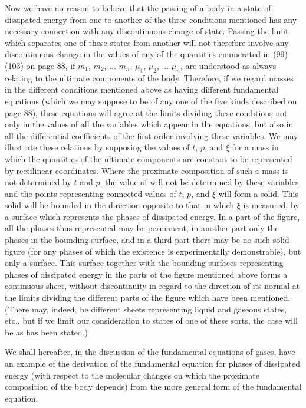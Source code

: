 \documentclass[12pt]{memoir}
\begin{document}
Now we have no reason to believe that the passing of a body in a state of dissipated energy from one to another of the three conditions mentioned has any necessary connection with any discontinuous change of state. Passing the limit which separates one of these states from another will not therefore involve any discontinuous change in the values of any of the quantities enumerated in (99)-(103) on page 88, if $m_1$, $m_2$, ... $m_n$, $\mu_1$, $\mu_2$, ... $\mu_n$, are understood as always relating to the ultimate components of the body. Therefore, if we regard masses in the different conditions mentioned above as having different fundamental equations (which we may suppose to be of any one of the five kinds described on page 88), these equations will agree at the limits dividing these conditions not only in the values of all the variables which appear in the equations, but also in all the differential coefficients of the first order involving these variables. We may illustrate these relations by supposing the values of $t$, $p$, and $\xi$ for a mass in which the quantities of the ultimate components are constant to be represented by rectilinear coordinates. Where the proximate composition of such a mass is not determined by $t$ and $p$, the value of  will not be determined by these variables, and the points representing connected values of $t$, $p$, and $\xi$ will form a solid. This solid will be bounded in the direction opposite to that in which $\xi$ is measured, by a surface which represents the phases of dissipated energy. In a part of the figure, all the phases thus represented may be permanent, in another part only the phases in the bounding surface, and in a third part there may be no such solid figure (for any phases of which the existence is experimentally demonstrable), but only a surface. This surface together with the bounding surfaces representing phases of dissipated energy in the parts of the figure mentioned above forms a continuous sheet, without discontinuity in regard to the direction of its normal at the limits dividing the different parts of the figure which have been mentioned. (There may, indeed, be different sheets representing liquid and gaseous states, etc., but if we limit our consideration to states of one of these sorts, the case will be as has been stated.)


We shall hereafter, in the discussion of the fundamental equations of gases, have an example of the derivation of the fundamental equation for phases of dissipated energy (with respect to the molecular changes on which the proximate composition of the body depends) from the more general form of the fundamental equation.
\end{document}
